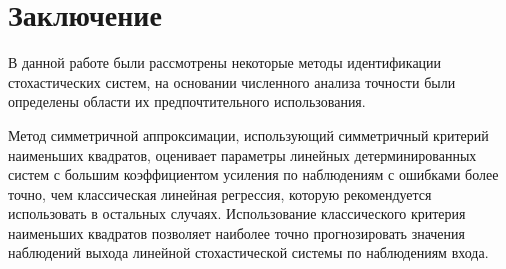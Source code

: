 \chapter*{Заключение}

В данной работе были рассмотрены некоторые методы идентификации стохастических систем,
на основании численного анализа точности были
определены области их предпочтительного использования.

Метод симметричной аппроксимации, использующий симметричный критерий наименьших квадратов,
оценивает параметры линейных детерминированных систем с большим коэффициентом усиления по
наблюдениям с ошибками более точно, чем классическая линейная регрессия,
которую рекомендуется использовать в остальных случаях.
Использование классического критерия наименьших квадратов позволяет наиболее точно
прогнозировать значения наблюдений выхода линейной стохастической системы по наблюдениям входа.















